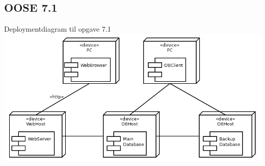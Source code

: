 \documentclass[12pt]{article}
\begin{document}
\subsection{OOSE 7.1}
Deploymentdiagram til opgave 7.1 \\
\includegraphics[scale=0.8]{diagrammer/E7_1} \\

{}
\end{document}

